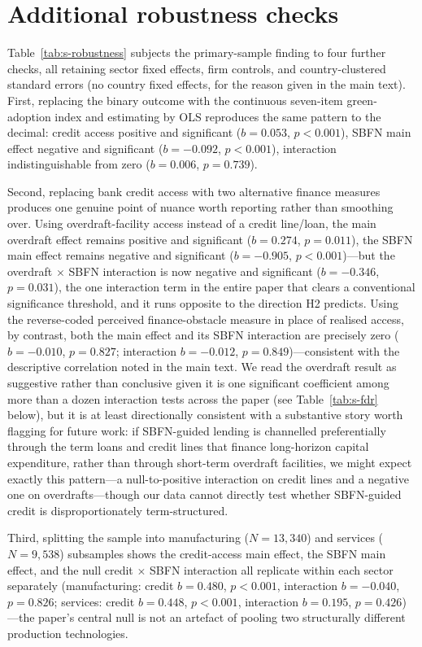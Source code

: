 \documentclass[12pt]{article}
\begin{document}
\section{Additional robustness checks}
\label{sec:s-robustness}

Table~\ref{tab:s-robustness} subjects the primary-sample finding to four further checks, all
retaining sector fixed effects, firm controls, and country-clustered standard errors (no country
fixed effects, for the reason given in the main text). First, replacing the binary outcome with the
continuous seven-item green-adoption index and estimating by OLS reproduces the same pattern to the
decimal: credit access positive and significant ($b=0.053$, $p<0.001$), SBFN main effect negative
and significant ($b=-0.092$, $p<0.001$), interaction indistinguishable from zero ($b=0.006$,
$p=0.739$).

Second, replacing bank credit access with two alternative finance measures produces one genuine
point of nuance worth reporting rather than smoothing over. Using overdraft-facility access instead
of a credit line/loan, the main overdraft effect remains positive and significant ($b=0.274$,
$p=0.011$), the SBFN main effect remains negative and significant ($b=-0.905$, $p<0.001$)---but the
overdraft $\times$ SBFN interaction is now negative and significant ($b=-0.346$, $p=0.031$), the one
interaction term in the entire paper that clears a conventional significance threshold, and it runs
opposite to the direction H2 predicts. Using the reverse-coded perceived finance-obstacle measure in
place of realised access, by contrast, both the main effect and its SBFN interaction are precisely
zero ($b=-0.010$, $p=0.827$; interaction $b=-0.012$, $p=0.849$)---consistent with the descriptive
correlation noted in the main text. We read the overdraft result as suggestive rather than
conclusive given it is one significant coefficient among more than a dozen interaction tests across
the paper (see Table~\ref{tab:s-fdr} below), but it is at least directionally consistent with a
substantive story worth flagging for future work: if SBFN-guided lending is channelled preferentially
through the term loans and credit lines that finance long-horizon capital expenditure, rather than
through short-term overdraft facilities, we might expect exactly this pattern---a null-to-positive
interaction on credit lines and a negative one on overdrafts---though our data cannot directly test
whether SBFN-guided credit is disproportionately term-structured.

Third, splitting the sample into manufacturing ($N=13{,}340$) and services ($N=9{,}538$) subsamples
shows the credit-access main effect, the SBFN main effect, and the null credit $\times$ SBFN
interaction all replicate within each sector separately (manufacturing: credit $b=0.480$, $p<0.001$,
interaction $b=-0.040$, $p=0.826$; services: credit $b=0.448$, $p<0.001$, interaction $b=0.195$,
$p=0.426$)---the paper's central null is not an artefact of pooling two structurally different
production technologies.
\end{document}
